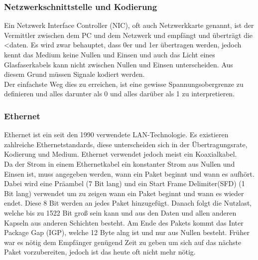 \documentclass{article}
\begin{document}
	 \subsubsection{Netzwerkschnittstelle und Kodierung}
	 Ein Netzwerk Interface Controller (NIC), oft auch Netzwerkkarte genannt, ist der Vermittler zwischen dem PC und dem Netzwerk und empfängt und überträgt die <daten.
	 Es wird zwar behauptet, dass 0er und 1er übertragen werden, jedoch kennt das Medium keine Nullen und Einsen und auch das Licht eines Glasfaserkabels kann nicht zwischen Nullen und Einsen unterscheiden. Aus diesem Grund müssen Signale kodiert werden. \\
	 Der einfachste Weg dies zu erreichen, ist eine gewisse Spannungsobergrenze zu definieren und alles darunter als 0 und alles darüber als 1 zu interpretieren. 
	 \subsubsection{Ethernet}
	 Ethernet ist ein seit den 1990 verwendete LAN-Technologie. Es existieren zahlreiche Ethernetstandards, diese unterscheiden sich in der Übertragungsrate, Kodierung und Medium. Ethernet verwendet jedoch meist ein Koaxialkabel. \\
	 Da der Strom in einem Ethernetkabel ein konstanter Strom aus Nullen und Einsen ist, muss angegeben werden, wann ein Paket beginnt und wann es aufhört. Dabei wird eine Präambel (7 Bit lang) und ein Start Frame Delimiter(SFD) (1 Bit lang) verwendet um zu zeigen wann ein Paket beginnt und wann es wieder endet. Diese 8 Bit werden an jedes Paket hinzugefügt. Danach folgt die Nutzlast, welche bis zu 1522 Bit groß sein kann und aus den Daten und allen anderen Kapseln aus anderen Schichten besteht. Am Ende des Pakets kommt das Inter Package Gap (IGP), welche 12 Byte alng ist und nur aus Nullen besteht. Früher war es nötig dem Empfänger genügend Zeit zu geben um sich auf das nächste Paket vorzubereiten, jedoch ist das heute oft nicht mehr nötig. \\
\end{document}

